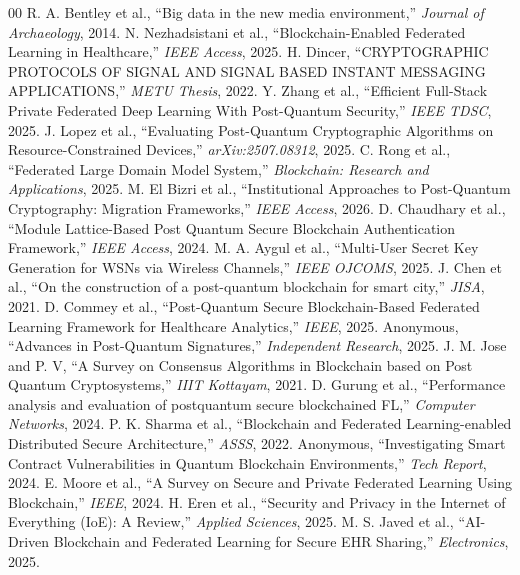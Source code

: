 \documentclass[journal, 10pt, twocolumn]{IEEEtran}
\begin{document}
\begin{thebibliography}{00}
 R. A. Bentley et al., ``Big data in the new media environment,'' \textit{Journal of Archaeology}, 2014.
 N. Nezhadsistani et al., ``Blockchain-Enabled Federated Learning in Healthcare,'' \textit{IEEE Access}, 2025.
 H. Dincer, ``CRYPTOGRAPHIC PROTOCOLS OF SIGNAL AND SIGNAL BASED INSTANT MESSAGING APPLICATIONS,'' \textit{METU Thesis}, 2022.
 Y. Zhang et al., ``Efficient Full-Stack Private Federated Deep Learning With Post-Quantum Security,'' \textit{IEEE TDSC}, 2025.
 J. Lopez et al., ``Evaluating Post-Quantum Cryptographic Algorithms on Resource-Constrained Devices,'' \textit{arXiv:2507.08312}, 2025.
 C. Rong et al., ``Federated Large Domain Model System,'' \textit{Blockchain: Research and Applications}, 2025.
 M. El Bizri et al., ``Institutional Approaches to Post-Quantum Cryptography: Migration Frameworks,'' \textit{IEEE Access}, 2026.
 D. Chaudhary et al., ``Module Lattice-Based Post Quantum Secure Blockchain Authentication Framework,'' \textit{IEEE Access}, 2024.
 M. A. Aygul et al., ``Multi-User Secret Key Generation for WSNs via Wireless Channels,'' \textit{IEEE OJCOMS}, 2025.
 J. Chen et al., ``On the construction of a post-quantum blockchain for smart city,'' \textit{JISA}, 2021.
 D. Commey et al., ``Post-Quantum Secure Blockchain-Based Federated Learning Framework for Healthcare Analytics,'' \textit{IEEE}, 2025.
 Anonymous, ``Advances in Post-Quantum Signatures,'' \textit{Independent Research}, 2025.
 J. M. Jose and P. V, ``A Survey on Consensus Algorithms in Blockchain based on Post Quantum Cryptosystems,'' \textit{IIIT Kottayam}, 2021.
 D. Gurung et al., ``Performance analysis and evaluation of postquantum secure blockchained FL,'' \textit{Computer Networks}, 2024.
 P. K. Sharma et al., ``Blockchain and Federated Learning-enabled Distributed Secure Architecture,'' \textit{ASSS}, 2022.
 Anonymous, ``Investigating Smart Contract Vulnerabilities in Quantum Blockchain Environments,'' \textit{Tech Report}, 2024.
 E. Moore et al., ``A Survey on Secure and Private Federated Learning Using Blockchain,'' \textit{IEEE}, 2024.
 H. Eren et al., ``Security and Privacy in the Internet of Everything (IoE): A Review,'' \textit{Applied Sciences}, 2025.
 M. S. Javed et al., ``AI-Driven Blockchain and Federated Learning for Secure EHR Sharing,'' \textit{Electronics}, 2025.

\end{thebibliography}
\end{document}
